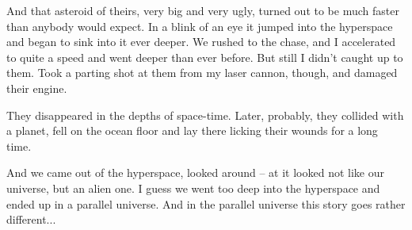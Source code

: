 \documentclass[ebook,twoside,final,openright]{memoir}
\begin{document}
And that asteroid of theirs, very big and very ugly, turned out to be much faster than anybody would expect. In a blink of an eye it jumped into the hyperspace and began to sink into it ever deeper. We rushed to the chase, and I accelerated to quite a speed and went deeper than ever before. But still I didn’t caught up to them. Took a parting shot at them from my laser cannon, though, and damaged their engine.\par
They disappeared in the depths of space-time. Later, probably, they collided with a planet, fell on the ocean floor and lay there licking their wounds for a long time.\par
And we came out of the hyperspace, looked around – at it looked not like our universe, but an alien one. I guess we went too deep into the hyperspace and ended up in a parallel universe. And in the parallel universe this story goes rather different...
\end{document}
